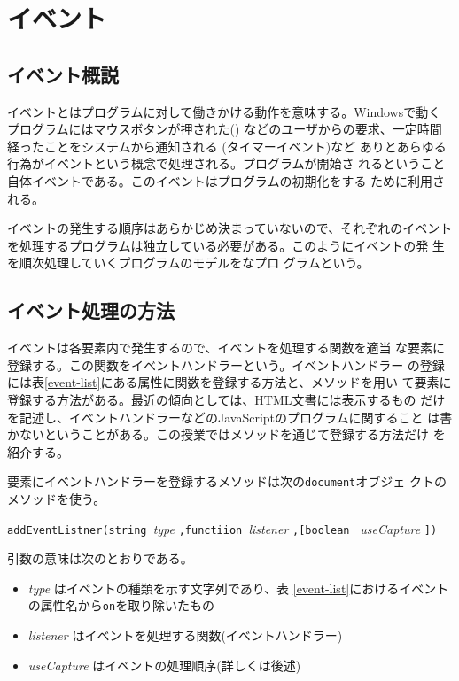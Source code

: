 \chapter{イベント}
 \section{イベント概説}
イベントとはプログラムに対して働きかける動作を意味する。Windowsで動く
プログラムにはマウスボタンが押された()
などのユーザからの要求、一定時間経ったことをシステムから通知される
(タイマーイベント)など
ありとあらゆる行為がイベントという概念で処理される。プログラムが開始さ
れるということ自体イベントである。このイベントはプログラムの初期化をする
ために利用される。

イベントの発生する順序はあらかじめ決まっていないので、それぞれのイベント
を処理するプログラムは独立している必要がある。このようにイベントの発
生を順次処理していくプログラムのモデルをなプロ
グラムという。

\section{イベント処理の方法}
イベントは各要素内で発生するので、イベントを処理する関数を適当
な要素に登録する。この関数をイベントハンドラーという。イベントハンドラー
の登録には表\ref{event-list}にある属性に関数を登録する方法と、メソッドを用い
て要素に登録する方法がある。最近の傾向としては、HTML文書には表示するもの
だけを記述し、イベントハンドラーなどのJavaScriptのプログラムに関すること
は書かないということがある。この授業ではメソッドを通じて登録する方法だけ
を紹介する。

要素にイベントハンドラーを登録するメソッドは次の\texttt{document}オブジェ
クトのメソッドを使う。

\texttt{addEventListner(string }{\sl type}
\texttt{,functiion }{\sl listener}
\texttt{,[boolean }
{\sl useCapture}
\texttt{])}

引数の意味は次のとおりである。
\begin{itemize}
 \item {\sl type} はイベントの種類を示す文字列であり、表
\ref{event-list}におけるイベントの属性名から\texttt{on}を取り除いたもの
 \item {\sl listener} はイベントを処理する関数(イベントハンドラー)
 \item {\sl useCapture} はイベントの処理順序(詳しくは後述)
\end{itemize}

